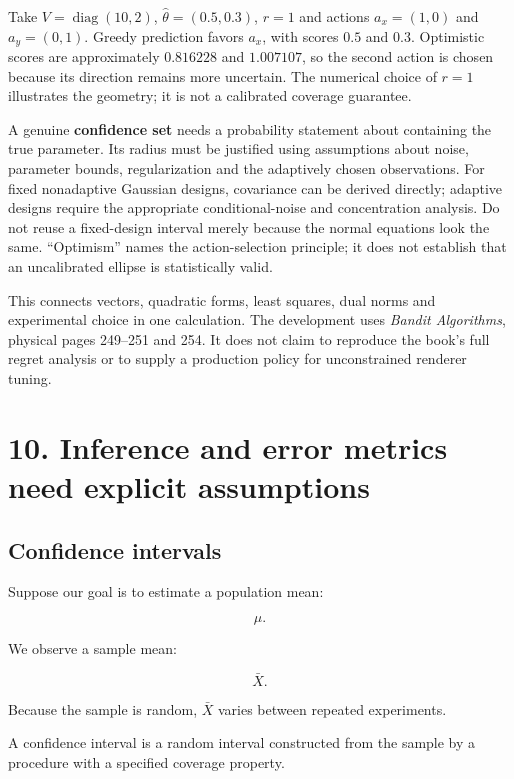 Take \(V=\operatorname{diag}(10,2)\), \(\widehat\theta=(0.5,0.3)\), \(r=1\) and actions \(a_x=(1,0)\) and \(a_y=(0,1)\). Greedy prediction favors \(a_x\), with scores \(0.5\) and \(0.3\). Optimistic scores are approximately \(0.816228\) and \(1.007107\), so the second action is chosen because its direction remains more uncertain. The numerical choice of \(r=1\) illustrates the geometry; it is not a calibrated coverage guarantee.

A genuine \textbf{confidence set} needs a probability statement about containing the true parameter. Its radius must be justified using assumptions about noise, parameter bounds, regularization and the adaptively chosen observations. For fixed nonadaptive Gaussian designs, covariance can be derived directly; adaptive designs require the appropriate conditional-noise and concentration analysis. Do not reuse a fixed-design interval merely because the normal equations look the same. ``Optimism'' names the action-selection principle; it does not establish that an uncalibrated ellipse is statistically valid.

This connects vectors, quadratic forms, least squares, dual norms and experimental choice in one calculation. The development uses \emph{Bandit Algorithms}, physical pages 249--251 and 254. It does not claim to reproduce the book's full regret analysis or to supply a production policy for unconstrained renderer tuning.

\section{10. Inference and error metrics need explicit assumptions}\label{02-foundations-ii-ch030-inference-and-error-metrics-need-explicit-assumptions}

\subsection{Confidence intervals}\label{02-foundations-ii-ch030-confidence-intervals}

Suppose our goal is to estimate a population mean:

\[
 \mu.
\]

We observe a sample mean:

\[
 \bar X.
\]

Because the sample is random, \(\bar X\) varies between repeated experiments.

A confidence interval is a random interval constructed from the sample by a procedure with a specified coverage property.

